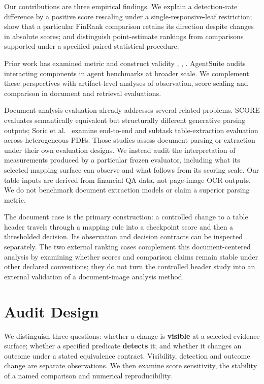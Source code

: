 \documentclass[runningheads]{llncs}
\begin{document}
Our contributions are three empirical findings. We explain a
detection-rate difference by a positive score rescaling under a
single-responsive-leaf restriction; show that a particular FinRank
comparison retains its direction despite changes in absolute scores; and
distinguish point-estimate rankings from comparisons supported under a
specified paired statistical procedure.

Prior work has examined metric and construct validity \cite{r3},
\cite{r4}, \cite{r5}. AgentSuite \cite{r6} audits interacting components
in agent benchmarks at broader scale. We complement these perspectives
with artifact-level analyses of observation, score scaling and
comparison in document and retrieval evaluations.

Document analysis evaluation already addresses several related problems.
SCORE \cite{r7} evaluates semantically equivalent but structurally
different generative parsing outputs; Soric et al.~\cite{r8} examine
end-to-end and subtask table-extraction evaluation across heterogeneous
PDFs. Those studies assess document parsing or extraction under their
own evaluation designs. We instead audit the interpretation of
measurements produced by a particular frozen evaluator, including what
its selected mapping surface can observe and what follows from its
scoring scale. Our table inputs are derived from financial QA data, not
page-image OCR outputs. We do not benchmark document extraction models
or claim a superior parsing metric.

The document case is the primary construction: a controlled change to a
table header travels through a mapping rule into a checkpoint score and
then a thresholded decision. Its observation and decision contracts can
be inspected separately. The two external ranking cases complement this
document-centered analysis by examining whether scores and comparison
claims remain stable under other declared conventions; they do not turn
the controlled header study into an external validation of a
document-image analysis method.

\section{Audit Design}\label{audit-design}

We distinguish three questions: whether a change is \textbf{visible} at
a selected evidence surface; whether a specified predicate
\textbf{detects} it; and whether it changes an outcome under a stated
equivalence contract. Visibility, detection and outcome change are
separate observations. We then examine score sensitivity, the stability
of a named comparison and numerical reproducibility.
\end{document}
